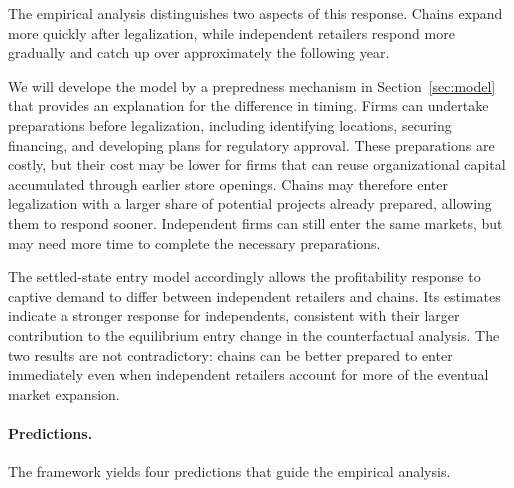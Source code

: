 \documentclass[english,12pt]{article}
\begin{document}
The empirical analysis distinguishes two aspects of this response. Chains expand more quickly after legalization, while independent retailers respond more gradually and catch up over approximately the following year.

We will develope the model by a prepredness mechanism in Section~\ref{sec:model} that provides an explanation for the difference in timing. Firms can undertake preparations before legalization, including identifying locations, securing financing, and developing plans for regulatory approval. These preparations are costly, but their cost may be lower for firms that can reuse organizational capital accumulated through earlier store openings. Chains may therefore enter legalization with a larger share of potential projects already prepared, allowing them to respond sooner. Independent firms can still enter the same markets, but may need more time to complete the necessary preparations.

The settled-state entry model accordingly allows the profitability response to captive demand to differ between independent retailers and chains. Its estimates indicate a stronger response for independents, consistent with their larger contribution to the equilibrium entry change in the counterfactual analysis. The two results are not contradictory: chains can be better prepared to enter immediately even when independent retailers account for more of the eventual market expansion.

\paragraph{Predictions.}
The framework yields four predictions that guide the empirical analysis.
\end{document}
